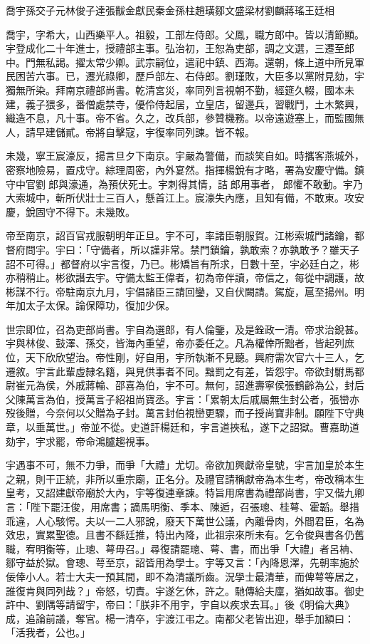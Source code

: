 
\begin{pinyinscope}
喬宇孫交子元林俊子達張黻金獻民秦金孫柱趙璜鄒文盛梁材劉麟蔣瑤王廷相

喬宇，字希大，山西樂平人。祖毅，工部左侍郎。父鳳，職方郎中。皆以清節顯。宇登成化二十年進士，授禮部主事。弘治初，王恕為吏部，調之文選，三遷至郎中。門無私謁。擢太常少卿。武宗嗣位，遣祀中鎮、西海。還朝，條上道中所見軍民困苦六事。已，遷光祿卿，歷戶部左、右侍郎。劉瑾敗，大臣多以黨附見劾，宇獨無所染。拜南京禮部尚書。乾清宮災，率同列言視朝不勤，經筵久輟，國本未建，義子猥多，番僧處禁寺，優伶侍起居，立皇店，留邊兵，習戰鬥，土木繁興，織造不息，凡十事。帝不省。久之，改兵部，參贊機務。以帝遠遊塞上，而監國無人，請早建儲貳。帝將自擊寇，宇復率同列諫。皆不報。

未幾，寧王宸濠反，揚言旦夕下南京。宇嚴為警備，而談笑自如。時攜客燕城外，密察地險易，置戍守。綜理周密，內外宴然。指揮楊銳有才略，署為安慶守備。鎮守中官劉郎與濠通，為預伏死士。宇刺得其情，詰郎用事者，郎懼不敢動。宇乃大索城中，斬所伏壯士三百人，懸首江上。宸濠失內應，且知有備，不敢東。攻安慶，銳固守不得下。未幾敗。

帝至南京，詔百官戎服朝明年正旦。宇不可，率諸臣朝服賀。江彬索城門諸鑰，都督府問宇。宇曰：「守備者，所以謹非常。禁門鎖鑰，孰敢索？亦孰敢予？雖天子詔不可得。」都督府以宇言復，乃已。彬矯旨有所求，日數十至，宇必廷白之，彬亦稍稍止。彬欲譖去宇。守備太監王偉者，初為帝伴讀，帝信之，每從中調護，故彬謀不行。帝駐南京九月，宇倡諸臣三請回鑾，又自伏闕請。駕旋，扈至揚州。明年加太子太保。論保障功，復加少保。

世宗即位，召為吏部尚書。宇自為選郎，有人倫鑒，及是銓政一清。帝求治銳甚。宇與林俊、鼓澤、孫交，皆海內重望，帝亦委任之。凡為權倖所黜者，皆起列庶位，天下欣欣望治。帝性剛，好自用，宇所執漸不見聽。興府需次官六十三人，乞遷敘。宇言此輩虛隸名籍，與見供事者不同。黜罰之有差，皆怨宇。帝欲封駙馬都尉崔元為侯，外戚蔣輪、邵喜為伯，宇不可。無何，詔進壽寧侯張鶴齡為公，封后父陳萬言為伯，授萬言子紹祖尚寶丞。宇言：「累朝太后戚屬無生封公者，張巒亦歿後贈，今奈何以父贈為子封。萬言封伯視巒更驟，而子授尚寶非制。願陛下守典章，以垂萬世。」帝並不從。史道訐楊廷和，宇言道挾私，遂下之詔獄。曹嘉助道劾宇，宇求罷，帝命鴻臚趨視事。

宇遇事不可，無不力爭，而爭「大禮」尤切。帝欲加興獻帝皇號，宇言加皇於本生之親，則干正統，非所以重宗廟，正名分。及禮官請稱獻帝為本生考，帝改稱本生皇考，又詔建獻帝廟於大內，宇等復連章諫。特旨用席書為禮部尚書，宇又偕九卿言：「陛下罷汪俊，用席書；謫馬明衡、季本、陳逅，召張璁、桂萼、霍韜。舉措乖違，人心駭愕。夫以一二人邪說，廢天下萬世公議，內離骨肉，外間君臣，名為效忠，實累聖德。且書不繇廷推，特出內降，此祖宗來所未有。乞令俊與書各仍舊職，宥明衡等，止璁、萼毋召。」尋復請罷璁、萼、書，而出爭「大禮」者呂柟、鄒守益於獄。會璁、萼至京，詔皆用為學士。宇等又言：「內降恩澤，先朝率施於佞倖小人。若士大夫一預其間，即不為清議所齒。況學士最清華，而俾萼等居之，誰復肯與同列哉？」帝怒，切責。宇遂乞休，許之。馳傳給夫廩，猶如故事。御史許中、劉隅等請留宇，帝曰：「朕非不用宇，宇自以疾求去耳。」後《明倫大典》成，追論前議，奪官。楊一清卒，宇渡江弔之。南都父老皆出迎，舉手加額曰：「活我者，公也。」


\end{pinyinscope}
